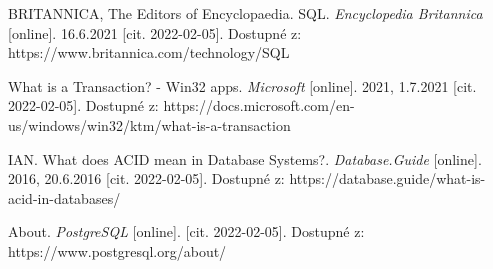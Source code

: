 \begin{thebibliography}{32}
BRITANNICA, The Editors of Encyclopaedia. SQL. \textit{Encyclopedia Britannica} [online]. 16.6.2021 [cit. 2022-02-05]. Dostupné z: https://www.britannica.com/technology/SQL

What is a Transaction? - Win32 apps. \textit{Microsoft} [online]. 2021, 1.7.2021 [cit. 2022-02-05]. Dostupné z: https://docs.microsoft.com/en-us/windows/win32/ktm/what-is-a-transaction

IAN. What does ACID mean in Database Systems?. \textit{Database.Guide} [online]. 2016, 20.6.2016 [cit. 2022-02-05]. Dostupné z: https://database.guide/what-is-acid-in-databases/

About. \textit{PostgreSQL} [online]. [cit. 2022-02-05]. Dostupné z: https://www.postgresql.org/about/


\end{thebibliography}